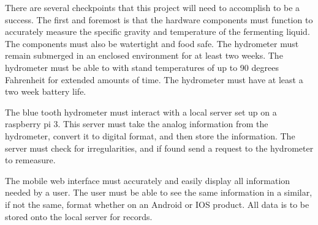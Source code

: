 There are several checkpoints that this project will need to accomplish to be a success.  The first and foremost is that the hardware components must function to accurately measure the specific gravity and temperature of the fermenting liquid.  The components must also be watertight and food safe.  The hydrometer must remain submerged in an enclosed environment for at least two weeks.  The hydrometer must be able to with stand temperatures of up to 90 degrees Fahrenheit for extended amounts of time.  The hydrometer must have at least a two week battery life.

The blue tooth hydrometer must interact with a local server set up on a raspberry pi 3.  This server must take the analog information from the hydrometer, convert it to digital format, and then store the information.  The server must check for irregularities, and if found send a request to the hydrometer to remeasure.  

The mobile web interface must accurately and easily display all information needed by a user.  The user must be able to see the same information in a similar, if not the same, format whether on an Android or IOS product.  All data is to be stored onto the local server for records.